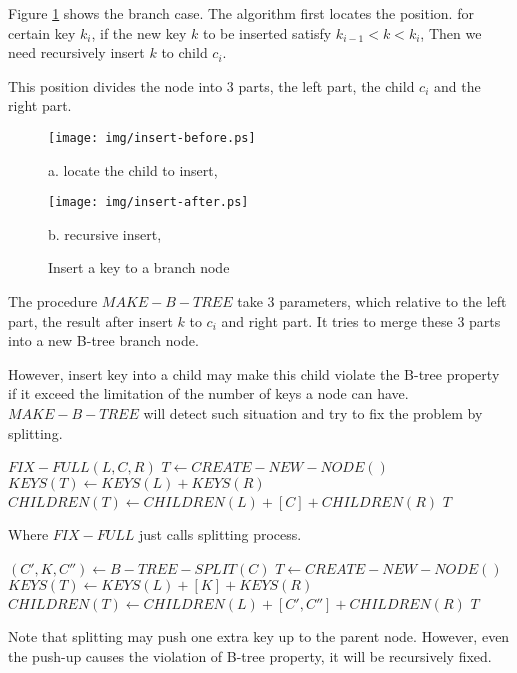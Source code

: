 \documentclass{article}
\begin{document}
Figure \ref{fig:recursive-insert} shows the branch case. The
algorithm first locates the position. for certain key $k_i$,
if the new key $k$ to be inserted satisfy $k_{i-1}<k<k_i$,
Then we need recursively insert $k$ to child $c_i$.

This position divides the node into 3 parts, the left part,
the child $c_i$ and the right part.

\begin{figure}[htbp]
       \begin{center}
       	  \texttt{[image: img/insert-before.ps]}

          a. locate the child to insert,

          \texttt{[image: img/insert-after.ps]}

          b. recursive insert,
        \caption{Insert a key to a branch node} \label{fig:recursive-insert}
       \end{center}
\end{figure}

The procedure $MAKE-B-TREE$ take 3 parameters, which relative to
the left part, the result after insert $k$ to $c_i$ and right part.
It tries to merge these 3 parts into a new B-tree branch node.

However, insert key into a child may make this child violate the
B-tree property if it exceed the limitation of the number of keys
a node can have. $MAKE-B-TREE$ will detect such situation and try
to fix the problem by splitting.

\begin{algorithmic}[1]
    \State \Return $FIX-FULL(L, C, R)$
  \Else
    \State $T \leftarrow CREATE-NEW-NODE()$
    \State $KEYS(T) \leftarrow KEYS(L) + KEYS(R)$
    \State $CHILDREN(T) \leftarrow CHILDREN(L)+[C]+CHILDREN(R)$
    \State \Return $T$
  \EndIf
\EndFunction
\end{algorithmic}

Where $FIX-FULL$ just calls splitting process.

\begin{algorithmic}[1]
  \State $(C', K, C'') \leftarrow B-TREE-SPLIT(C)$
  \State $T \leftarrow CREATE-NEW-NODE()$
  \State $KEYS(T) \leftarrow KEYS(L)+[K]+KEYS(R)$
  \State $CHILDREN(T) \leftarrow CHILDREN(L)+[C', C'']+CHILDREN(R)$
  \State \Return $T$
\EndFunction
\end{algorithmic}

Note that splitting may push one extra key up to the parent node.
However, even the push-up causes the violation of B-tree property,
it will be recursively fixed.
\end{document}
